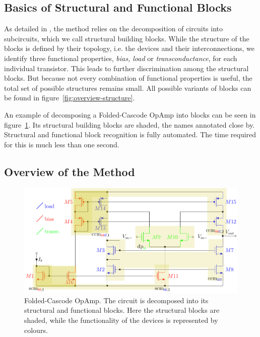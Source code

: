 \documentclass[conference]{IEEEtran}
\begin{document}
 	\subsection{Basics of Structural and Functional Blocks}
 	As detailed in \cite{ leibl24inverse}, the method  relies on the decomposition of circuits into subcircuits, which we call structural building blocks.
 	While the structure of the blocks is defined by their topology, i.e. the devices and their interconnections, we identify three functional properties, \textit{bias, load} or \textit{transconductance}, for each individual transistor. This leads to further discrimination among the structural blocks. But because not every combination of functional properties is useful, the total set of possible structures remains small. 
	All possible variants of blocks can be found in figure~\ref{fig:overview-structure}.
	
	An example of decomposing a Folded-Cascode OpAmp into blocks can be seen in figure~\ref{fig:simple53}. Its structural building blocks are shaded, the names annotated close by.
	Structural and functional block recognition is fully automated. The time required for this is much less than one second. 
	
\subsection{Overview of the Method}
	\begin{figure}[]
		\centering
		\includegraphics[width=\linewidth]{figures/simple52_partitioning}
		\caption{Folded-Cascode OpAmp. The circuit is decomposed into its structural and functional blocks. Here the structural blocks are shaded, while the functionality of the devices is represented by colours. }
		\label{fig:simple53}
	\end{figure}
	
\end{document}
